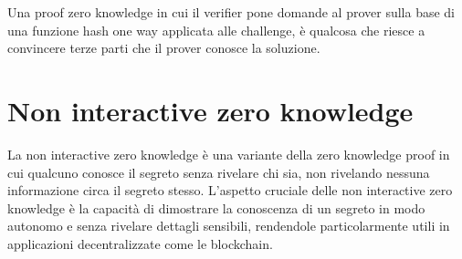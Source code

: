 Una proof zero knowledge in cui il verifier pone domande al prover sulla base di una funzione hash 
one way applicata alle challenge, è qualcosa che riesce a convincere terze parti che il prover
conosce la soluzione.
\section{Non interactive zero knowledge}
La non interactive zero knowledge è una variante della zero knowledge proof in cui qualcuno 
conosce il segreto senza rivelare chi sia, non rivelando nessuna informazione circa il segreto
stesso. L'aspetto cruciale delle non interactive zero knowledge è la capacità di dimostrare
la conoscenza di un segreto in modo autonomo e senza rivelare
dettagli sensibili, rendendole particolarmente utili in applicazioni decentralizzate come le blockchain.